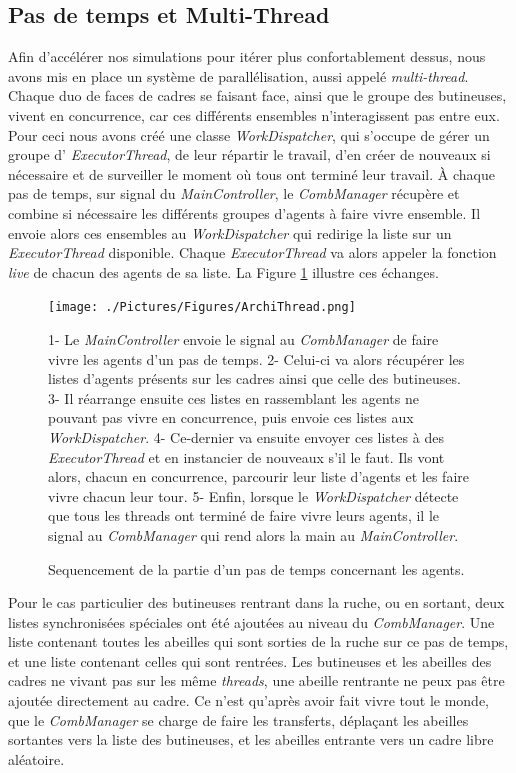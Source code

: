 			\subsection{Pas de temps et Multi-Thread}
			Afin d'accélérer nos simulations pour itérer plus confortablement dessus, nous avons mis en place un système de parallélisation, aussi appelé \textit{multi-thread}. Chaque duo de faces de cadres se faisant face, ainsi que le groupe des butineuses, vivent en concurrence, car ces différents ensembles n'interagissent pas entre eux. Pour ceci nous avons créé une classe \textit{WorkDispatcher}, qui s'occupe de gérer un groupe d' \textit{ExecutorThread}, de leur répartir le travail, d'en créer de nouveaux si nécessaire et de surveiller le moment où tous ont terminé leur travail. À chaque pas de temps, sur signal du \textit{MainController}, le \textit{CombManager} récupère et combine si nécessaire les différents groupes d'agents à faire vivre ensemble. Il envoie alors ces ensembles au \textit{WorkDispatcher} qui redirige la liste sur un \textit{ExecutorThread} disponible. Chaque \textit{ExecutorThread} va alors appeler la fonction \textit{live} de chacun des agents de sa liste. La Figure \ref{ArchiThread} illustre ces échanges.
			
			\begin{figure}
			\centering
			\texttt{[image: ./Pictures/Figures/ArchiThread.png]}
			\caption{Sequencement de la partie d'un pas de temps concernant les agents.}{1- Le \textit{MainController} envoie le signal au \textit{CombManager} de faire vivre les agents d'un pas de temps. 2- Celui-ci va alors récupérer les listes d'agents présents sur les cadres ainsi que celle des butineuses. 3- Il réarrange ensuite ces listes en rassemblant les agents ne pouvant pas vivre en concurrence, puis envoie ces listes aux \textit{WorkDispatcher}. 4- Ce-dernier va ensuite envoyer ces listes à des \textit{ExecutorThread} et en instancier de nouveaux s'il le faut. Ils vont alors, chacun en concurrence, parcourir leur liste d'agents et les faire vivre chacun leur tour. 5- Enfin, lorsque le \textit{WorkDispatcher} détecte que tous les threads ont terminé de faire vivre leurs agents, il le signal au \textit{CombManager} qui rend alors la main au \textit{MainController}.}
			\label{ArchiThread}
			\end{figure}
			
			Pour le cas particulier des butineuses rentrant dans la ruche, ou en sortant, deux listes synchronisées spéciales ont été ajoutées au niveau du \textit{CombManager}. Une liste contenant toutes les abeilles qui sont sorties de la ruche sur ce pas de temps, et une liste contenant celles qui sont rentrées. Les butineuses et les abeilles des cadres ne vivant pas sur les même \textit{threads}, une abeille rentrante ne peux pas être ajoutée directement au cadre. Ce n'est qu'après avoir fait vivre tout le monde, que le \textit{CombManager} se charge de faire les transferts, déplaçant les abeilles sortantes vers la liste des butineuses, et les abeilles entrante vers un cadre libre aléatoire.
			
